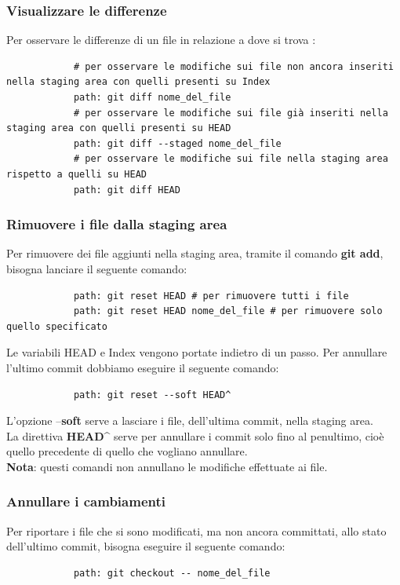 	
		\subsubsection{Visualizzare le differenze} %
		\label{ssub:visualizzare_le_differenze}
		Per osservare le differenze di un file in relazione a dove si trova	:
			\begin{verbatim}
			# per osservare le modifiche sui file non ancora inseriti nella staging area con quelli presenti su Index
			path: git diff nome_del_file
			# per osservare le modifiche sui file già inseriti nella staging area con quelli presenti su HEAD
			path: git diff --staged nome_del_file
			# per osservare le modifiche sui file nella staging area rispetto a quelli su HEAD
			path: git diff HEAD
			\end{verbatim}

		
		\subsubsection{Rimuovere i file dalla staging area} %
		\label{ssub:rimuovere_i_file_dalla_staging_area}
		Per rimuovere dei file aggiunti nella staging area, tramite il comando \textbf{git add}, bisogna lanciare il seguente comando:
			\begin{verbatim}
			path: git reset HEAD # per rimuovere tutti i file
			path: git reset HEAD nome_del_file # per rimuovere solo quello specificato
			\end{verbatim}
		\noindent
		Le variabili HEAD e Index vengono portate indietro di un passo.
		Per annullare l'ultimo commit dobbiamo eseguire il seguente comando:
			\begin{verbatim}
			path: git reset --soft HEAD^
			\end{verbatim}
		\noindent
		L'opzione --\textbf{soft} serve a lasciare i file, dell'ultima commit, nella staging area. \\
		La direttiva \textbf{HEAD\^} serve per annullare i commit solo fino al penultimo, cioè quello precedente di quello che vogliano annullare. \\
		\textbf{Nota}: questi comandi non annullano le modifiche effettuate ai file.
		
		
		\subsubsection{Annullare i cambiamenti} %
		\label{ssub:annullare_i_cambiamenti}
		Per riportare i file che si sono modificati, ma non ancora committati, allo stato dell'ultimo commit, bisogna eseguire il seguente comando:
			\begin{verbatim}
			path: git checkout -- nome_del_file
			\end{verbatim}
	
